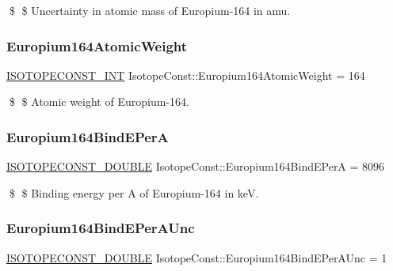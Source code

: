 \$ \$ Uncertainty in atomic mass of Europium-\/164 in amu. \mbox{\label{group___isotope_const-_europium-_eu164_gad132f846b4a2bbdba0ee973eddc16eb0}} 
\subsubsection{\texorpdfstring{Europium164\+Atomic\+Weight}{Europium164AtomicWeight}}
{\footnotesize\ttfamily \mbox{\hyperlink{group___isotope_const-_macros_ga5f18360b3e99483a35c32d789e62621c}{I\+S\+O\+T\+O\+P\+E\+C\+O\+N\+S\+T\+\_\+\+I\+NT}} Isotope\+Const\+::\+Europium164\+Atomic\+Weight = 164}

\$ \$ Atomic weight of Europium-\/164. \mbox{\label{group___isotope_const-_europium-_eu164_ga2be99c0bf3b8275de812b6690d613a32}} 
\subsubsection{\texorpdfstring{Europium164\+Bind\+E\+PerA}{Europium164BindEPerA}}
{\footnotesize\ttfamily \mbox{\hyperlink{group___isotope_const-_macros_ga8f45a7272ce02c0b4c65c44636ed719a}{I\+S\+O\+T\+O\+P\+E\+C\+O\+N\+S\+T\+\_\+\+D\+O\+U\+B\+LE}} Isotope\+Const\+::\+Europium164\+Bind\+E\+PerA = 8096}

\$ \$ Binding energy per A of Europium-\/164 in keV. \mbox{\label{group___isotope_const-_europium-_eu164_ga055e4063dfe7efc36358a468f7cfac8f}} 
\subsubsection{\texorpdfstring{Europium164\+Bind\+E\+Per\+A\+Unc}{Europium164BindEPerAUnc}}
{\footnotesize\ttfamily \mbox{\hyperlink{group___isotope_const-_macros_ga8f45a7272ce02c0b4c65c44636ed719a}{I\+S\+O\+T\+O\+P\+E\+C\+O\+N\+S\+T\+\_\+\+D\+O\+U\+B\+LE}} Isotope\+Const\+::\+Europium164\+Bind\+E\+Per\+A\+Unc = 1}

